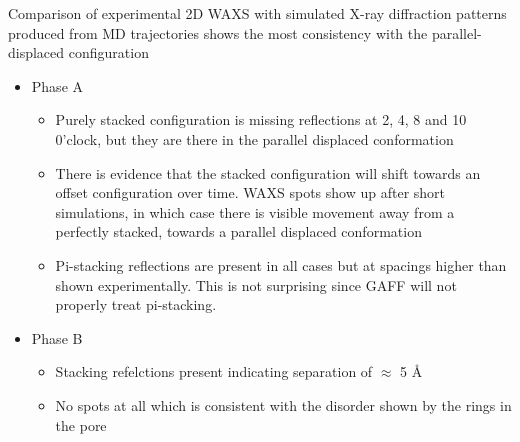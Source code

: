 \documentclass{article}
\newcommand{\angstrom}{\textup{\AA}}
\begin{document}
	Comparison of experimental 2D WAXS with simulated X-ray diffraction patterns produced from MD trajectories shows the most consistency with the parallel-displaced configuration
	\begin{itemize}
		\item Phase A
		\begin{itemize}	
			\item Purely stacked configuration is missing reflections at 2, 4, 8 and 10 0'clock, but they are there in the parallel displaced conformation
			\item There is evidence that the stacked configuration will shift towards an offset configuration over time. WAXS spots show up after short simulations, in which case there is visible movement away from a perfectly stacked, towards a parallel displaced conformation 
			\item Pi-stacking reflections are present in all cases but at spacings higher than shown experimentally. This is not surprising since GAFF will not properly treat pi-stacking.
		\end{itemize}
		\item Phase B
		\begin{itemize}
			\item Stacking refelctions present indicating separation of $\approx$ 5 \angstrom
			\item No spots at all which is consistent with the disorder shown by the rings in the pore
		\end{itemize}
	\end{itemize} 
\end{document}
